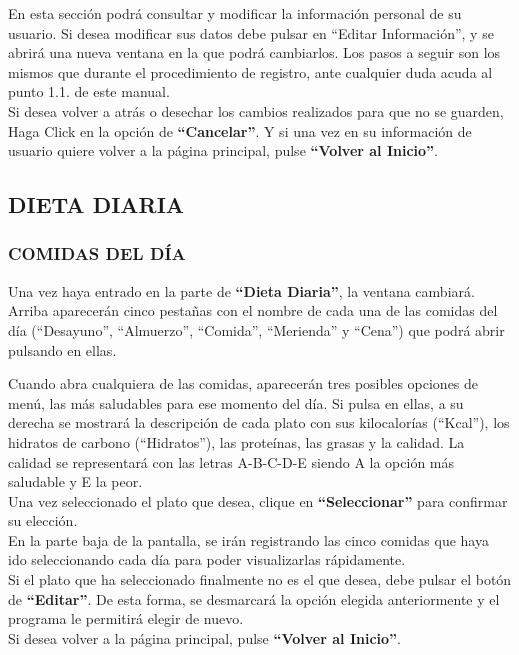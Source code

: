 En esta sección podrá consultar y modificar la información personal de su usuario. Si desea modificar sus datos debe pulsar en “Editar Información”, y se abrirá una nueva ventana en la que podrá cambiarlos. Los pasos a seguir son los mismos que durante el procedimiento de registro, ante cualquier duda acuda al punto 1.1. de este manual.\\
Si desea volver a atrás o desechar los cambios realizados para que no se guarden, Haga Click en la opción de \textbf{“Cancelar”}. Y si una vez en su información de usuario quiere volver a la página principal, pulse \textbf{“Volver al Inicio”}.
\subsection{DIETA DIARIA}
\subsubsection{COMIDAS DEL DÍA}
Una vez haya entrado en la parte de \textbf{“Dieta Diaria”}, la ventana cambiará. Arriba aparecerán cinco pestañas con el nombre de cada una de las comidas del día (“Desayuno”, “Almuerzo”, “Comida”, “Merienda” y “Cena”) que podrá abrir pulsando en ellas.\\

Cuando abra cualquiera de las comidas, aparecerán tres posibles opciones de menú, las más saludables para ese momento del día. Si pulsa en ellas, a su derecha se mostrará la descripción de cada plato con sus kilocalorías (“Kcal”), los hidratos de carbono (“Hidratos”), las proteínas, las grasas y la calidad. La calidad se representará con las letras A-B-C-D-E siendo A la opción más saludable y E la peor.\\

Una vez seleccionado el plato que desea, clique en \textbf{“Seleccionar”} para confirmar su elección.\\

En la parte baja de la pantalla, se irán registrando las cinco comidas que haya ido seleccionando cada día para poder visualizarlas rápidamente.\\
Si el plato que ha seleccionado finalmente no es el que desea, debe pulsar el botón de \textbf{“Editar”}. De esta forma, se desmarcará la opción elegida anteriormente y el programa le permitirá elegir de nuevo.\\
Si desea volver a la página principal, pulse \textbf{“Volver al Inicio”}.
